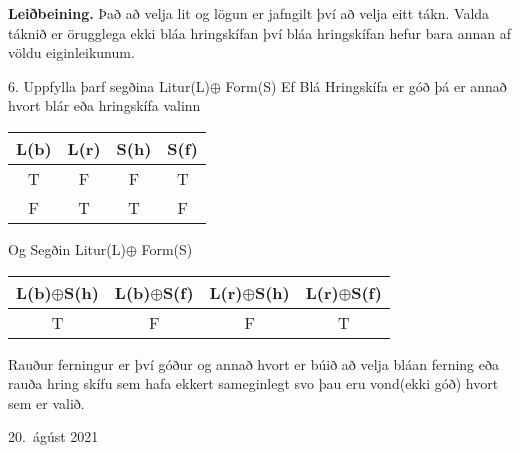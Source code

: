 \documentclass[12pt]{article}
\begin{document}
  {\bf Leiðbeining.}  Það að velja lit og lögun er jafngilt því að velja eitt tákn.  Valda táknið er örugglega ekki bláa hringskífan því bláa hringskífan hefur bara annan af völdu eiginleikunum.

6. Uppfylla þarf segðina Litur(L)$\oplus$ Form(S)
\newline Ef Blá Hringskífa er góð þá er annað  hvort blár eða hringskífa valinn

\begin{center}
    \begin{tabular}{||c c c c||} 
     \hline
     L(b) & L(r) & S(h) & S(f) \\ [0.5ex] 
     \hline\hline
     T & F & F & T \\ 
     \hline 
     \hline
     F & T & T & F \\ 
     \hline 
     
    \end{tabular}
    \end{center}

Og Segðin Litur(L)$\oplus$ Form(S)
\newline
\begin{center}
    \begin{tabular}{||c c c c||} 
	\hline
	L(b)$\oplus$S(h) & L(b)$\oplus$S(f) & L(r)$\oplus$S(h) & L(r)$\oplus$S(f) \\ [0.5ex] 
	\hline\hline
	T & F & F & T \\ 

	\hline 
	\hline
\end{tabular}
\end{center}
Rauður ferningur er því góður og annað hvort er búið að velja bláan ferning eða rauða hring skífu sem hafa ekkert sameginlegt svo þau eru vond(ekki góð) hvort sem er valið.






















\vfill  20.~ágúst 2021
\hfill  
\end{document}
